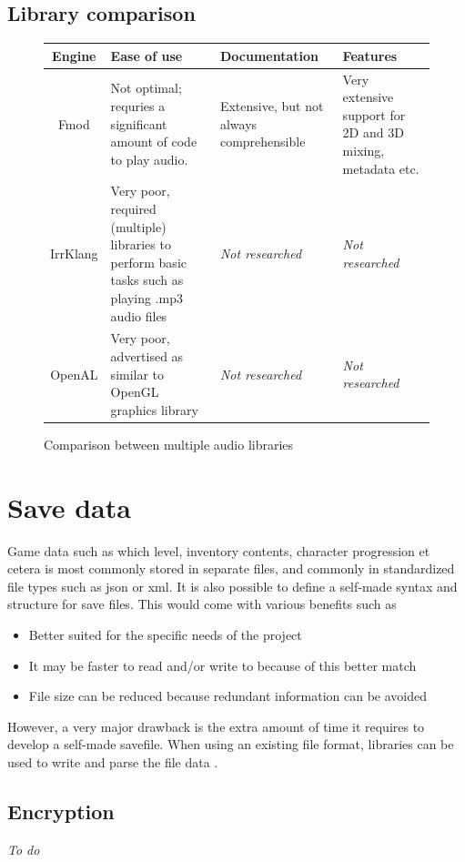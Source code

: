 \documentclass{article} %
\begin{document}
\subsection{Library comparison}
\begin{figure}[h!]
	\centering
    \begin{tabularx}{\textwidth}{|c|X|X|X|} \hline
        \textbf{Engine} & \textbf{Ease of use} & \textbf{Documentation} & \textbf{Features} \\ \hline
        Fmod & Not optimal; requries a significant amount of code to play audio. & Extensive, but not always comprehensible & Very extensive support for 2D and 3D mixing, metadata etc. \\ \hline
        IrrKlang & Very poor, required (multiple) libraries to perform basic tasks such as playing .mp3 audio files & \textit{Not researched} & \textit{Not researched} \\ \hline
		OpenAL & Very poor, advertised as similar to OpenGL graphics library & \textit{Not researched} & \textit{Not researched} \\ \hline
    \end{tabularx}
    \caption{Comparison between multiple audio libraries}
	\label{fig:audioLibComparison}
\end{figure}

\section{Save data}
Game data such as which level, inventory contents, character progression et cetera is most commonly stored in separate files, and commonly in standardized file types such as json or xml.
It is also possible to define a self-made syntax and structure for save files. This would come with various benefits such as
\begin{itemize}
	\item Better suited for the specific needs of the project
	\item It may be faster to read and/or write to because of this better match
	\item File size can be reduced because redundant information can be avoided
\end{itemize}
However, a very major drawback is the extra amount of time it requires to develop a self-made savefile.
When using an existing file format, libraries can be used to write and parse the file data \cite{stackUser35344} \cite{LazyFoo}.

\subsection{Encryption}
\textit{To do}
\end{document}

